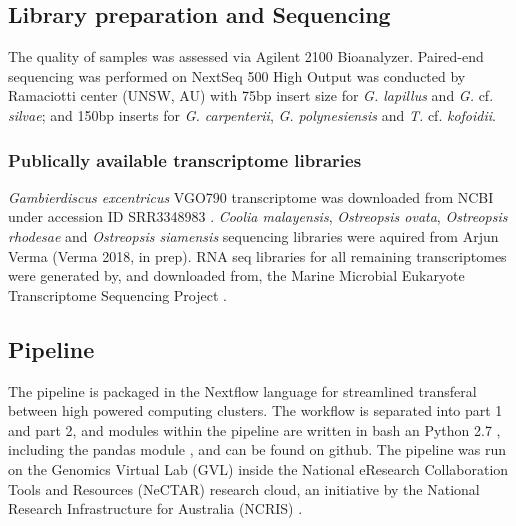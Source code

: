 \documentclass[12pt]{article}
\begin{document}
\subsection*{Library preparation and Sequencing}
The quality of samples was assessed via Agilent 2100 Bioanalyzer. 
Paired-end sequencing was performed on NextSeq 500 High Output was conducted by Ramaciotti center (UNSW, AU) with 75bp insert size for \emph{G. lapillus} and \emph{G.} cf. \emph{silvae}; and 150bp inserts for \emph{G. carpenterii}, \emph{G. polynesiensis} and \emph{T.} cf. \emph{kofoidii}.
\subsubsection*{Publically available transcriptome libraries}
\emph{Gambierdiscus excentricus} VGO790 transcriptome was downloaded from NCBI under accession ID SRR3348983 \cite{kohli2017role}. 
\textit{Coolia malayensis}, \textit{Ostreopsis ovata}, \textit{Ostreopsis rhodesae} and \textit{Ostreopsis siamensis} sequencing libraries were aquired from Arjun Verma (Verma 2018, in prep). 
RNA seq libraries for all remaining transcriptomes were generated by, and downloaded from, the Marine Microbial Eukaryote Transcriptome Sequencing Project \citep{keeling2014marine}.

\subsection*{Pipeline}
The pipeline is packaged in the Nextflow language \cite{nextflow} for streamlined transferal between high powered computing clusters. 
The workflow is separated into part 1 and part 2, and modules within the pipeline are written in bash an Python 2.7 \cite{python}, including the pandas module \cite{pandas}, and can be found on github. The pipeline was run on the Genomics Virtual Lab (GVL) \cite{afgan2015genomics} inside the National eResearch Collaboration Tools and Resources (NeCTAR) research cloud, an initiative by the National Research Infrastructure for Australia (NCRIS) \cite{nectar}.
\end{document}
